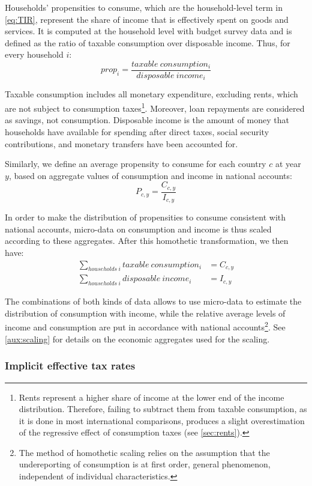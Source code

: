 \documentclass[12pt]{article}
\begin{document}
Households' propensities to consume, which are the household-level term in \cref{eq:TIR}, represent the share of income that is effectively spent on goods and services. It is computed at the household level with budget survey data and is defined as the ratio of taxable consumption over disposable income. Thus, for every household $i$:
\[ prop_i = \frac{taxable \ consumption_i}{disposable \ income_i} \]

Taxable consumption includes all monetary expenditure, excluding rents, which are not subject to consumption taxes\footnote{Rents represent a higher share of income at the lower end of the income distribution. Therefore, failing to subtract them from taxable consumption, as it is done in most international comparisons, produces a slight overestimation of the regressive effect of consumption taxes (see \cref{sec:rents}).}. Moreover, loan repayments are considered as savings, not consumption. Disposable income is the amount of money that households have available for spending after direct taxes, social security contributions, and monetary transfers have been accounted for.

Similarly, we define an average propensity to consume for each country $c$ at year $y$, based on aggregate values of consumption and income in national accounts:
\[ P_{c,y} = \frac{C_{c,y}}{I_{c,y}} \]

In order to make the distribution of propensities to consume consistent with national accounts, micro-data on consumption and income is thus scaled according to these aggregates. After this homothetic transformation, we then have:
\begin{align*}
	\sum_{households\ i} taxable \ consumption_i &= C_{c,y} \\
	\sum_{households\ i} disposable \ income_i &= I_{c,y}
\end{align*}

The combinations of both kinds of data allows to use micro-data to estimate the distribution of consumption with income, while the relative average levels of income and consumption are put in accordance with national accounts\footnote{The method of homothetic scaling relies on the assumption that the undereporting of consumption is at first order, general phenomenon, independent of individual characteristics.}. See \cref{aux:scaling} for details on the economic aggregates used for the scaling.

\subsubsection{Implicit effective tax rates}
\label{subsub:ITR}
\end{document}
